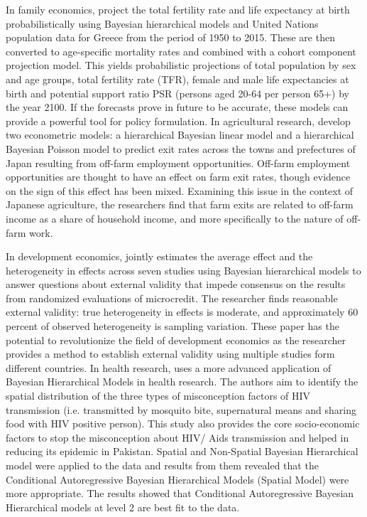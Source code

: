 In family economics, \cite{lamnisos2019demographic} project the total fertility rate and life expectancy at birth probabilistically using Bayesian hierarchical models and United Nations population data for Greece from the period of 1950 to 2015. These are then converted to age-specific mortality rates and combined with a cohort component projection model. This yields probabilistic projections of total population by sex and age groups, total fertility rate (TFR), female and male life expectancies at birth and potential support ratio PSR (persons aged 20-64 per person 65+) by the year 2100. If the forecasts prove in future to be accurate, these models can provide a powerful tool for policy formulation. In agricultural research, \cite{ ramsey2019saying} develop two econometric models: a hierarchical Bayesian linear model and a hierarchical Bayesian Poisson model to predict exit rates across the towns and prefectures of Japan resulting from off-farm employment opportunities. Off-farm employment opportunities are thought to have an effect on farm exit rates, though evidence on the sign of this effect has been mixed. Examining this issue in the context of Japanese agriculture, the researchers find that farm exits are related to off-farm income as a share of household income, and more specifically to the nature of off-farm work.

In development economics, \cite{ meager2019understanding} jointly estimates the average effect and the heterogeneity in effects across seven studies using Bayesian hierarchical models to answer questions about external validity that impede consensus on the results from randomized evaluations of microcredit. The researcher finds reasonable external validity: true heterogeneity in effects is moderate, and approximately 60 percent of observed heterogeneity is sampling variation. These paper has the potential to revolutionize the field of development economics as the researcher provides a method to establish external validity using multiple studies form different countries. In health research, \cite{ rashid2019socio} uses a more advanced application of Bayesian Hierarchical Models in health research. The authors aim to identify the spatial distribution of the three types of misconception factors of HIV transmission (i.e. transmitted by mosquito bite, supernatural means and sharing food with HIV positive person). This study also provides the core socio-economic factors to stop the misconception about HIV/ Aids transmission and helped in reducing its epidemic in Pakistan. Spatial and Non-Spatial Bayesian Hierarchical model were applied to the data and results from them revealed that the Conditional Autoregressive Bayesian Hierarchical Models (Spatial Model) were more appropriate. The results showed that Conditional Autoregressive Bayesian Hierarchical models at level 2 are best fit to the data.

